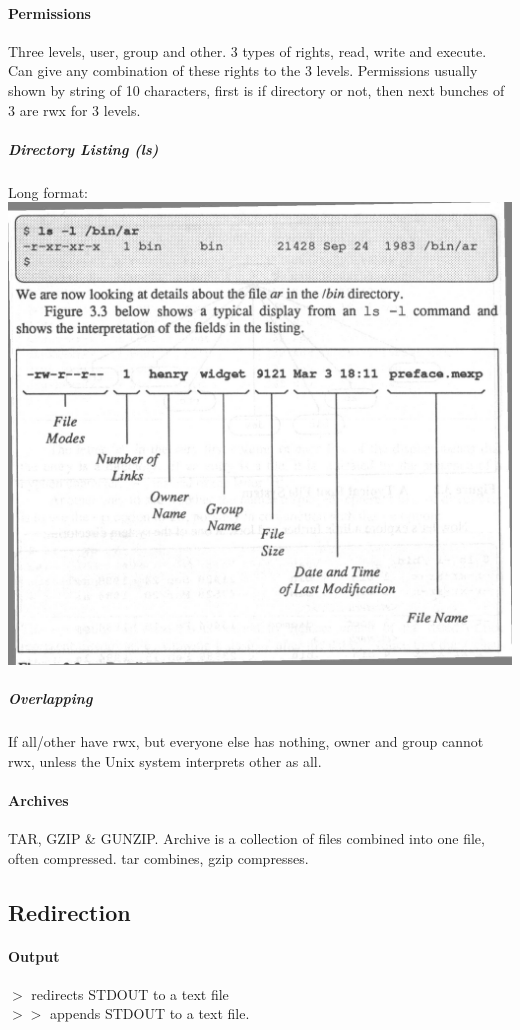 \documentclass[12 pt]{article}
\begin{document}
	\paragraph{Permissions}
	Three levels, user, group and other. 3 types of rights, read, write and execute. Can give any combination of these rights to the 3 levels. Permissions usually shown by string of 10 characters, first is if directory or not, then next bunches of 3 are rwx for 3 levels.
		\subparagraph{Directory Listing (ls)}
		Long format: \\\includegraphics[scale=0.3]{ls}
	\subparagraph{Overlapping} If all/other have rwx, but everyone else has nothing, owner and group cannot rwx, unless the Unix system interprets other as all.
	\paragraph{Archives} TAR, GZIP \& GUNZIP. Archive is a collection of files combined into one file, often compressed. tar combines, gzip compresses. 
	\subsection{Redirection}
	\paragraph{Output} $>$ redirects STDOUT to a text file
	\\ $>>$ appends STDOUT to a text file.
\end{document}
